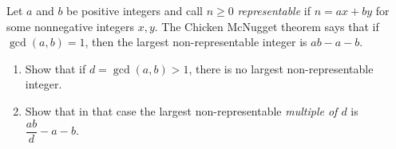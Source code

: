 Let $a$ and $b$ be positive integers and call $n\ge0$ \emph{representable} if $n=ax+by$ for some nonnegative integers $x,y$. The Chicken McNugget theorem says that if $\gcd(a,b)=1$, then the largest non-representable integer is $ab-a-b$.
\begin{enumerate}
\item[(a)] Show that if $d=\gcd(a,b)>1$, there is no largest non-representable integer.
\item[(b)] Show that in that case the largest non-representable \emph{multiple of $d$} is $\dfrac{ab}{d}-a-b$.
\end{enumerate}

